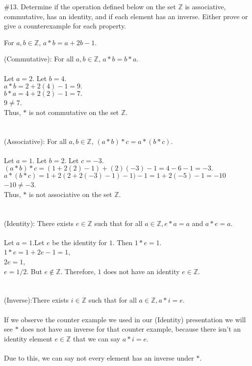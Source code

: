 \documentclass[11pt]{amsart}
\begin{document}
\vskip 0.4in
\#13. Determine if the operation defined below on the set $\mathbb{Z}$ is associative, commutative, has an identity, and if each element has an inverse. Either prove or give a counterexample for each property.\\
\begin{center}
For $a,b \in \mathbb{Z}$, $a \ast b = a+2b - 1$.\\
\end{center}
\vskip 0.2in
(Commutative): For all $a,b\in \mathbb{Z}$, $a\ast b=b\ast a.$
\\
\\Let $a=2.$ Let $b=4$. 
\\$a\ast b=2+2(4)-1=9.$ 
\\$b\ast a=4+2(2)-1=7.$
\\$9\neq 7$. 
\\Thus, $\ast$ is not commutative on the set $\mathbb{Z}$.
\\
\\
\\(Associative): For all $a,b\in \mathbb{Z}$, $(a\ast b)\ast c=a\ast (b\ast c).$
\\
\\Let $a=1.$ Let $b=2.$ Let $c=-3.$
\\$(a\ast b)\ast c=(1+2(2)-1)+(2)(-3)-1=4-6-1=-3.$
\\$a\ast (b\ast c)=1+2(2+2(-3)-1)-1)-1=1+2(-5)-1=-10$
\\$-10\neq -3$. 
\\Thus, $\ast$ is not associative on the set $\mathbb{Z}.$
\\
\\
\\(Identity): There exists $e\in \mathbb{Z}$ such that for all $a\in \mathbb{Z}, e\ast a=a$ and $a\ast e=a.$
\\
\\Let $a = 1$.Let $e$ be the identity for $1$. Then $1\ast e=1.$
\\$1\ast e= 1+2e-1=1$,
\\$2e=1$,
\\$e=1/2.$ But $e\notin\mathbb{Z}.$ Therefore, $1$ does not have an identity $e \in\mathbb{Z}$.
\\
\\
\\(Inverse):There exists $i\in \mathbb{Z}$ such that for all $a\in\mathbb{Z}, a\ast i=e$.
\\
\\If we observe the counter example we used in our (Identity) presentation we will see $\ast$ does not have an inverse for that counter example, because there isn't an identity element $e\in\mathbb{Z}$ that we can say $a\ast i=e$.
\\
\\Due to this, we can say not every element has an inverse under
 $\ast$.
\end{document}
